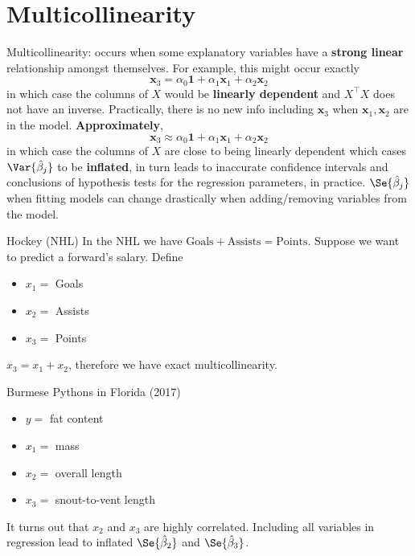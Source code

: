 \section{Multicollinearity}
Multicollinearity: occurs when some explanatory
variables have a \textbf{strong linear}
relationship amongst themselves. For example,
this might occur exactly
\[ \symbf{x}_3=\alpha_0\symbf{1}+\alpha_1\symbf{x}_1+\alpha_2\symbf{x}_2 \]
in which case the columns of $ X $ would be \textbf{linearly dependent}
and $ X^\top X $ does not have an inverse. Practically,
there is no new info including $ \symbf{x}_3 $
when $ \symbf{x}_1,\symbf{x}_2 $ are in the model.
\textbf{Approximately},
\[ \symbf{x}_3\approx \alpha_0\symbf{1}+\alpha_1\symbf{x}_1+\alpha_2\symbf{x}_2 \]
in which case the columns of $ X $ are close to being
linearly dependent which cases $ \Var{\hat{\beta}_j} $
to be \textbf{inflated}, in turn leads to inaccurate confidence
intervals and conclusions of hypothesis tests
for the regression parameters, in practice.
$ \Se{\hat{\beta}_j} $ when fitting models can change drastically
when adding/removing variables from the model.

\begin{Example}{Hockey (NHL)}{}
      In the NHL we have $ \text{Goals}+\text{Assists}=\text{Points} $.
      Suppose we want to predict a forward's salary. Define
      \begin{itemize}
            \item $ x_1= $ Goals
            \item $ x_2= $ Assists
            \item $ x_3= $ Points
      \end{itemize}
      $ x_3=x_1+x_2 $, therefore we have exact multicollinearity.
\end{Example}
\begin{Example}{Burmese Pythons in Florida (2017)}{}
      \begin{itemize}
            \item $ y= $ fat content
            \item $ x_1= $ mass
            \item $ x_2= $ overall length
            \item $ x_3= $ snout-to-vent length
      \end{itemize}
      It turns out that $ x_2 $ and $ x_3 $ are highly
      correlated. Including all variables in
      regression lead to inflated $ \Se{\hat{\beta}_2} $
      and $ \Se{\hat{\beta}_3} $.
\end{Example}


